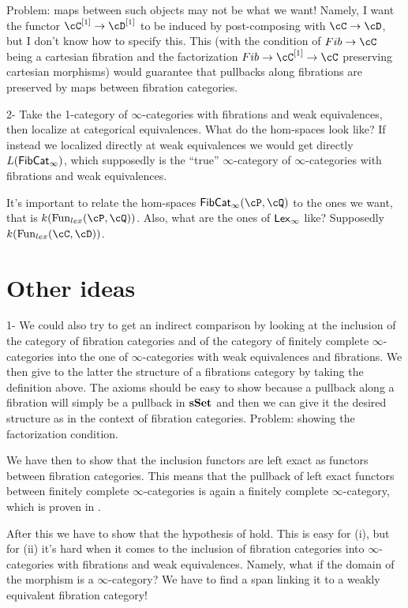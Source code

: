 \documentclass[a4paper,12pt,openany]{scrartcl}
\begin{document}
Problem: maps between such objects may not be what we want! Namely, I want the
functor $\cC^{[1]}\rightarrow\cD^{[1]}$ to be induced by post-composing with
$\cC\rightarrow\cD$, but I don't know how to specify this. This (with the
condition of $Fib\rightarrow\cC$ being a cartesian fibration and the
factorization $Fib\rightarrow\cC^{[1]}\rightarrow\cC$ preserving cartesian
morphisms) would guarantee that pullbacks along fibrations are preserved by maps
between fibration categories.

2- Take the 1-category of $\infty$-categories with fibrations and weak
equivalences, then localize at categorical equivalences. What do the hom-spaces
look like? If instead we localized directly at weak equivalences we would get
directly $L(\operatorname{\mathsf{FibCat}}_\infty)$, which supposedly is the ``true'' $\infty$-category
of $\infty$-categories with fibrations and weak equivalences.

It's important to relate the hom-spaces $\FibCat_\infty(\cP,\cQ)$ to the ones we
want, that is $k(\Fun_{lex}(\cP,\cQ))$. Also, what are the ones of $\operatorname{\mathsf{Lex}_\infty}$ like?
Supposedly $k(\Fun_{lex}(\cC,\cD))$.

\section{Other ideas}

1- We could also try to get an indirect comparison by looking at the inclusion of the category of fibration categories and of the category of finitely complete $\infty$-categories into the one of $\infty$-categories with weak equivalences and fibrations. We then give to the latter the structure of a fibrations category by taking the definition above. The axioms should be easy to show because a pullback along a fibration will simply be a pullback in $\operatorname{\mathbf{sSet}}$ and then we can give it the desired structure as in the context of fibration categories. Problem: showing the factorization condition.

We have then to show that the inclusion functors are left exact as functors
between fibration categories. This means that the pullback of left exact
functors between finitely complete $\infty$-categories is again a finitely
complete $\infty$-category, which is proven in \cite[Lem.\ 2.11]{Szu17b}.

After this we have to show that the hypothesis of \cite[Thm.\ 7.6.15]{Cis19} hold. This is easy for (i), but for (ii) it's hard when it comes to the inclusion of fibration categories into $\infty$-categories with fibrations and weak equivalences. Namely, what if the domain of the morphism is a $\infty$-category? We have to find a span linking it to a weakly equivalent fibration category!
\end{document}
